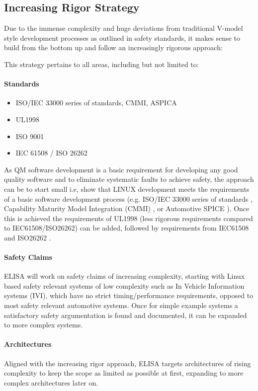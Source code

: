 \documentclass[12pt]{ElisaPaper}
\begin{document}
\subsection{Increasing Rigor Strategy}
Due to the immense complexity and huge deviations from traditional V-model style development processes as outlined in safety standards, it makes sense to build from the bottom up and follow an increasingly rigorous approach:

This strategy pertains to all areas, including but not limited to:
\paragraph{Standards}
\begin{itemize}
	\item ISO/IEC 33000 series of standards, CMMI, ASPICA \cite{ISO3300x:2015,CMMI,ASPICE}
	\item UL1998 \cite{UL1998}
	\item ISO 9001 \cite{ISO9001:2015}
	\item IEC 61508 / ISO 26262 \cite{IEC61508:2010,ISO26262:2018}
\end{itemize}
As QM software development is a basic requirement for developing any good quality software and to eliminate systematic faults to achieve safety, the approach can be to start small i.e, show that LINUX development meets the requirements of a basic software development process (e.g. ISO/IEC 33000 series of standards \cite{ISO3300x:2015}, Capability Maturity Model Integration (CMMI) \cite{CMMI}, or Automotive SPICE \cite{ASPICE}). Once this is achieved the requirements of UL1998 \cite{UL1998} (less rigorous requirements compared to IEC61508/ISO26262) can be added, followed by requirements from IEC61508 and ISO26262 \cite{IEC61508:2010,ISO26262:2018}.
\paragraph{Safety Claims}
ELISA will work on safety claims of increasing complexity, starting with Linux based safety relevant systems of low complexity such as In Vehicle Information systems (IVI), which have no strict timing/performance requirements, opposed to most safety relevant automotive systems. 
Once for simple example systems a satisfactory safety argumentation is found and documented, it can be expanded to more complex systems.
\paragraph{Architectures}
Aligned with the increasing rigor approach, ELISA targets architectures of rising complexity to keep the scope as limited as possible at first, expanding to more complex architectures later on.
\end{document}
